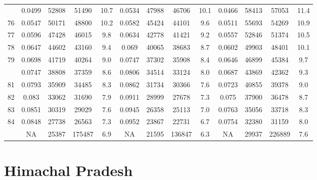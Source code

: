 \documentclass[
  14pt,
]{article}
\begin{document}
\begin{longtable}[t]{lcccccccccccc}
\addlinespace
75 & 0.0499 & 52808 & 51490 & 10.7 & 0.0534 & 47988 & 46706 & 10.1 & 0.0466 & 58413 & 57053 & 11.4\\
76 & 0.0547 & 50171 & 48800 & 10.2 & 0.0582 & 45424 & 44101 & 9.6 & 0.0511 & 55693 & 54269 & 10.9\\
77 & 0.0596 & 47428 & 46015 & 9.8 & 0.0634 & 42778 & 41421 & 9.2 & 0.0557 & 52846 & 51374 & 10.5\\
78 & 0.0647 & 44602 & 43160 & 9.4 & 0.069 & 40065 & 38683 & 8.7 & 0.0602 & 49903 & 48401 & 10.1\\
79 & 0.0698 & 41719 & 40264 & 9.0 & 0.0747 & 37302 & 35908 & 8.4 & 0.0646 & 46899 & 45384 & 9.7\\
\addlinespace
80 & 0.0747 & 38808 & 37359 & 8.6 & 0.0806 & 34514 & 33124 & 8.0 & 0.0687 & 43869 & 42362 & 9.3\\
81 & 0.0793 & 35909 & 34485 & 8.3 & 0.0862 & 31734 & 30366 & 7.6 & 0.0723 & 40855 & 39378 & 9.0\\
82 & 0.083 & 33062 & 31690 & 7.9 & 0.0911 & 28999 & 27678 & 7.3 & 0.075 & 37900 & 36478 & 8.7\\
83 & 0.0851 & 30319 & 29029 & 7.6 & 0.0945 & 26358 & 25113 & 7.0 & 0.0763 & 35056 & 33718 & 8.3\\
84 & 0.0848 & 27738 & 26563 & 7.3 & 0.0952 & 23867 & 22731 & 6.7 & 0.0754 & 32380 & 31159 & 8.0\\
\addlinespace
85 & NA & 25387 & 175487 & 6.9 & NA & 21595 & 136847 & 6.3 & NA & 29937 & 226889 & 7.6\\*
\end{longtable}

\pagebreak

\hypertarget{himachal-pradesh}{%
\section{Himachal Pradesh}\label{himachal-pradesh}}
\end{document}
